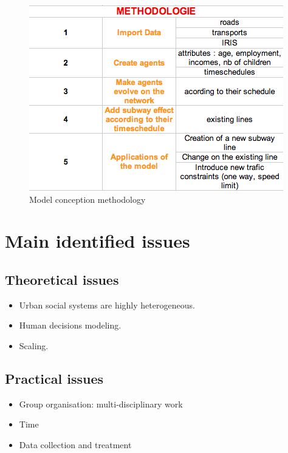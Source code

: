 \documentclass[english]{beamer}
\def\lyxframeend{} %
\begin{document}
\begin{figure}
\hfill{}\includegraphics[scale=0.6]{methodoProject}\hfill{}\hfill{}\caption{Model conception methodology}
\end{figure}



\lyxframeend{}\section{Main identified issues}


\lyxframeend{}\subsection{Theoretical issues}


\lyxframeend{}
\begin{itemize}
\item Urban social systems are highly heterogeneous.


\pause{}

\item Human decisions modeling.


\pause{}

\item Scaling.
\end{itemize}

\lyxframeend{}\subsection{Practical issues}


\lyxframeend{}
\begin{itemize}
\item Group organisation: multi-disciplinary work


\pause{}

\item Time


\pause{}

\item Data collection and treatment
\end{itemize}
\end{document}
